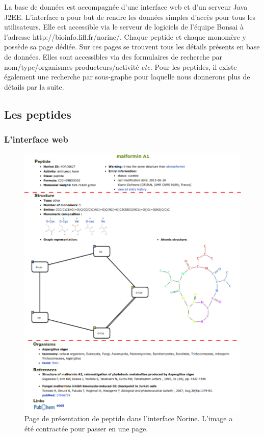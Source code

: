 La base de données est accompagnée d'une interface web et d'un serveur Java J2EE.
L'interface a pour but de rendre les données simples d'accès pour tous les utilisateurs.
Elle est accessible via le serveur de logiciels de l'équipe Bonsai à l'adresse http://bioinfo.lifl.fr/norine/.
Chaque peptide et chaque monomère y possède sa page dédiée.
Sur ces pages se trouvent tous les détails présents en base de données.
Elles sont accessibles via des formulaires de recherche par nom/type/organismes producteurs/activité \textit{etc.}
Pour les peptides, il existe également une recherche par sous-graphe pour laquelle nous donnerons plus de détails par la suite.



\subsection{Les peptides}

\subsubsection{L'interface web}

\begin{figure}[h!]
  \begin{center}
    \includegraphics[width=450px]{Figures/Norine/malformin_nor.png}
    \caption{\label{interface}Page de présentation de peptide dans l'interface Norine.
    L'image a été contractée pour passer en une page.}
  \end{center}
\end{figure}


